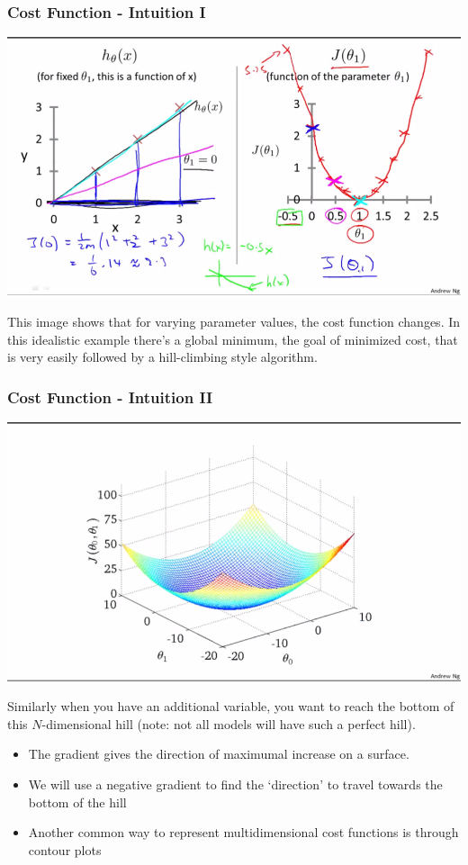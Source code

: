 \subsubsection{Cost Function - Intuition I}
\begin{center}
	\includegraphics[scale=0.75]{sections/cs229/w1/cost_function.png}
\end{center}
This image shows that for varying parameter values, the cost function changes. In this idealistic example there's a global minimum, the goal of minimized cost, that is very easily followed by a hill-climbing style algorithm.

\subsubsection{Cost Function - Intuition II}
\begin{center}
	\includegraphics[scale=0.75]{sections/cs229/w1/2d_cost_function.png}
\end{center}
Similarly when you have an additional variable, you want to reach the bottom of this $N$-dimensional hill (note: not all models will have such a perfect hill). 
\begin{itemize}[--]
	\item The gradient gives the direction of maximumal increase on a surface.
	\item We will use a negative gradient to find the `direction' to travel towards the bottom of the hill
	\item Another common way to represent multidimensional cost functions is through contour plots
\end{itemize}

